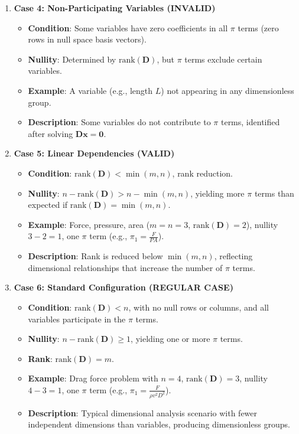 \documentclass[
	11pt, %
	fleqn, %
	a4paper, %
]{LegrandOrangeBook}
\begin{document}
\begin{enumerate}
  \item \textbf{Case 4: Non-Participating Variables (INVALID)}
    \begin{itemize}
        \item \textbf{Condition}: Some variables have zero coefficients in all $\pi$ terms (zero rows in null space basis vectors).
        \item \textbf{Nullity}: Determined by $\text{rank}(\mathbf{D})$, but $\pi$ terms exclude certain variables.
        \item \textbf{Example}: A variable (e.g., length $L$) not appearing in any dimensionless group.
        \item \textbf{Description}: Some variables do not contribute to $\pi$ terms, identified after solving $\mathbf{D} \mathbf{x} = \mathbf{0}$.
    \end{itemize}


    \item \textbf{Case 5: Linear Dependencies (VALID)}
    \begin{itemize}
        \item \textbf{Condition}: $\text{rank}(\mathbf{D}) < \min(m, n)$, rank reduction.
        \item \textbf{Nullity}: $n - \text{rank}(\mathbf{D}) > n - \min(m, n)$, yielding more $\pi$ terms than expected if $\text{rank}(\mathbf{D}) = \min(m, n)$.
        \item \textbf{Example}: Force, pressure, area ($m=n=3$, $\text{rank}(\mathbf{D})=2$), nullity $3-2=1$, one $\pi$ term (e.g., $\pi_1 = \frac{F}{P A}$).
        \item \textbf{Description}: Rank is reduced below $\min(m, n)$, reflecting dimensional relationships that increase the number of $\pi$ terms.
    \end{itemize}


        \item \textbf{Case 6: Standard Configuration (REGULAR CASE)}
    \begin{itemize}
        \item \textbf{Condition}: $\text{rank}(\mathbf{D}) < n$, with no null rows or columns, and all variables participate in the $\pi$ terms.
        \item \textbf{Nullity}: $n - \text{rank}(\mathbf{D}) \geq 1$, yielding one or more $\pi$ terms.

        \item \textbf{Rank}: $\text{rank}(\mathbf{D}) = m$.

        \item \textbf{Example}: Drag force problem with $n=4$, $\text{rank}(\mathbf{D})=3$, nullity $4-3=1$, one $\pi$ term (e.g., $\pi_1 = \frac{F}{\rho v^2 D^2}$).
        \item \textbf{Description}: Typical dimensional analysis scenario with fewer independent dimensions than variables, producing dimensionless groups.
    \end{itemize}
\end{enumerate}
\end{document}
